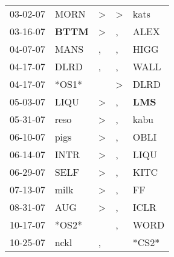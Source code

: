 \begin{supertabular}{p{0.07\textwidth}p{0.06\textwidth}p{0.02\textwidth}p{0.02\textwidth}p{0.06\textwidth}}
          03-02-07\textsuperscript{} &           MORN\textsuperscript{} &     \textgreater &     \textgreater &           kats\textsuperscript{} \\
          03-16-07\textsuperscript{} &  \textbf{BTTM\textsuperscript{}} &     \textgreater &                , &           ALEX\textsuperscript{} \\
          04-07-07\textsuperscript{} &           MANS\textsuperscript{} &                , &                , &           HIGG\textsuperscript{} \\
          04-17-07\textsuperscript{} &           DLRD\textsuperscript{} &                , &                , &           WALL\textsuperscript{} \\
          04-17-07\textsuperscript{} &                            *OS1* &                  &     \textgreater &           DLRD\textsuperscript{} \\
          05-03-07\textsuperscript{} &           LIQU\textsuperscript{} &     \textgreater &                , &   \textbf{LMS\textsuperscript{}} \\
          05-31-07\textsuperscript{} &           reso\textsuperscript{} &     \textgreater &                , &           kabu\textsuperscript{} \\
          06-10-07\textsuperscript{} &           pigs\textsuperscript{} &     \textgreater &                , &           OBLI\textsuperscript{} \\
          06-14-07\textsuperscript{} &           INTR\textsuperscript{} &     \textgreater &                , &           LIQU\textsuperscript{} \\
          06-29-07\textsuperscript{} &           SELF\textsuperscript{} &     \textgreater &                , &           KITC\textsuperscript{} \\
          07-13-07\textsuperscript{} &           milk\textsuperscript{} &     \textgreater &                , &             FF\textsuperscript{} \\
          08-31-07\textsuperscript{} &            AUG\textsuperscript{} &     \textgreater &                , &           ICLR\textsuperscript{} \\
          10-17-07\textsuperscript{} &                            *OS2* &                  &                , &           WORD\textsuperscript{} \\
          10-25-07\textsuperscript{} &           nckl\textsuperscript{} &                , &                  &                            *CS2* \\

\end{supertabular}
